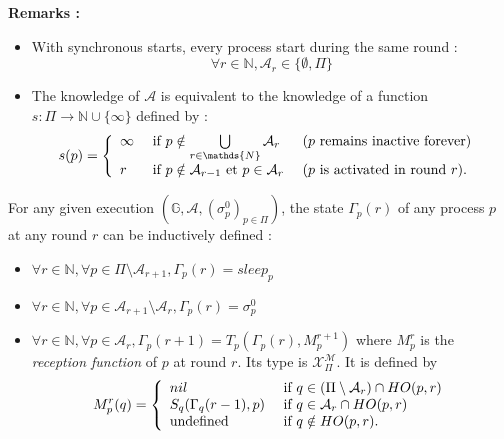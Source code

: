 \documentclass{article}
\begin{document}
\textbf{Remarks :}

\begin{itemize}
	\item With synchronous starts, every process start during the same round : 
		$$\forall r \in \mathds{N}, \mathcal{A}_r \in \{\emptyset, \Pi\}$$

	\item The knowledge of $\mathcal{A}$ is equivalent to the knowledge of a function
		$s : \Pi \rightarrow \mathds{N} \cup \{\infty\}$ defined by :
		$$s(p) = \left \{ \begin{array}{l ll}
		  \infty & \mbox{ if  } p \notin \bigcup\limits_{r \in \mathds{N}}  \mathcal{A}_r & 
			  \mbox { ($p$ remains inactive forever) } \\
		  r  & \mbox{ if  } p \notin \mathcal{A}_{r-1} \mbox{ et } p \in \mathcal{A}_{r}  &
			  \mbox{ ($p$ is activated in round $r$)}.
		  \end{array} \right.$$

\end{itemize}

For any given execution $(\mathds{G}, \mathcal{A}, (\sigma^0_p)_{p \in \Pi})$,
the state $\Gamma_p(r)$ of any process $p$ at any round $r$ can be inductively defined :

\begin{itemize}
	\item $\forall r \in \mathds{N}, \forall p \in \Pi \setminus \mathcal{A}_{r+1}, \Gamma_p(r) = sleep_p$
	\item $\forall r \in \mathds{N}, \forall p \in \mathcal{A}_{r+1} \setminus \mathcal{A}_r,
		\Gamma_p(r) = \sigma^0_p$
	\item $\forall r \in \mathds{N}, \forall p \in \mathcal{A}_r, \Gamma_p(r+1) = T_p(\Gamma_p(r), M_p^{r+1})$
		where $M_p^r$ is the \textit{reception function} of $p$ at round $r$.
		Its type is $\mathcal{X}_\Pi^{\mathcal{M}}$.
		It is defined by
			$$ M_p^r(q) = \left \{ \begin{array}{l l}
	                         nil  & \mbox{ if  } q \in (\Pi \setminus \mathcal{A}_r  ) \cap  HO(p,r)  \\
	                         S_q (\Gamma_q(r-1), p)  & \mbox{ if  }   q \in \mathcal{A}_r  \cap  HO(p,r) \\
	                         \mbox{undefined} & \mbox{ if  }   q \notin  HO(p,r) .
	                          \end{array} \right.$$ 
\end{itemize}
\end{document}

